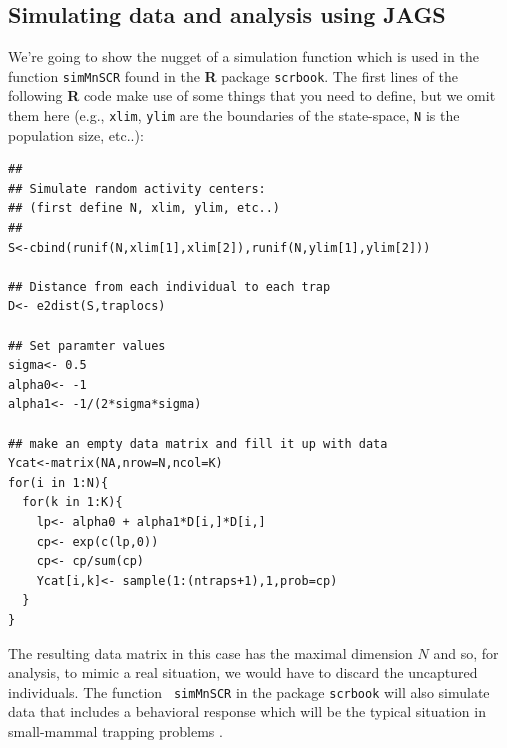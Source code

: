 \subsection{Simulating data and analysis using JAGS}

We're going to show the nugget of a simulation function which is
used in the function \mbox{\tt simMnSCR} found in the {\bf R} package
\mbox{\tt scrbook}.  The first lines of the following {\bf R} code
make use of some things that you need to define, but we omit them here
(e.g., \mbox{\tt xlim}, \mbox{\tt ylim} are the boundaries of the
state-space, \mbox{\tt N} is the population size, etc..):
\begin{samepage}
{\small
\begin{verbatim}
##
## Simulate random activity centers: 
## (first define N, xlim, ylim, etc..)
##
S<-cbind(runif(N,xlim[1],xlim[2]),runif(N,ylim[1],ylim[2]))

## Distance from each individual to each trap
D<- e2dist(S,traplocs)

## Set paramter values
sigma<- 0.5
alpha0<- -1
alpha1<- -1/(2*sigma*sigma)

## make an empty data matrix and fill it up with data
Ycat<-matrix(NA,nrow=N,ncol=K)
for(i in 1:N){
  for(k in 1:K){
    lp<- alpha0 + alpha1*D[i,]*D[i,]
    cp<- exp(c(lp,0))
    cp<- cp/sum(cp)
    Ycat[i,k]<- sample(1:(ntraps+1),1,prob=cp)
  }
}
\end{verbatim}
}
\end{samepage}
The resulting data matrix in this case has the maximal dimension $N$
and so, for analysis, to mimic a real situation, we would have to
discard the uncaptured individuals.  The function \mbox{\tt
  simMnSCR} in the package \mbox{\tt scrbook} will also simulate
data that includes a behavioral response
 which will be the
typical situation in small-mammal trapping problems
\citep[see][for details]{converse_royle:2012}.

